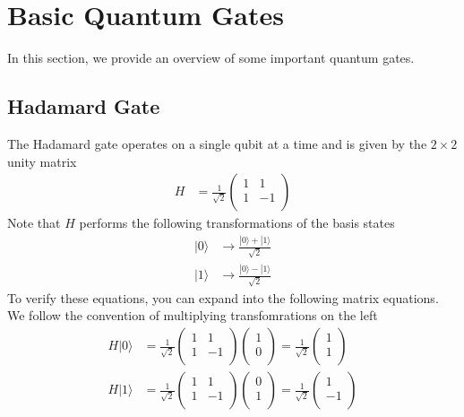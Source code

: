 \documentclass[book.tex]{subfiles}
\begin{document}
\section{Basic Quantum Gates}

In this section, we provide an overview of some important quantum gates. 

\subsection{Hadamard Gate}
The Hadamard gate operates on a single qubit at a time and is given by the $2\times 2$ unity matrix
\begin{align}
    H &= \frac{1}{\sqrt{2}}\begin{pmatrix}
    1 & 1 \\
    1 & -1 \\
    \end{pmatrix}
\end{align}
Note that $H$ performs the following transformations of the basis states
\begin{align}
    |0 \rangle & \to \frac{|0\rangle + |1 \rangle}{\sqrt{2}} \\
    |1 \rangle & \to \frac{|0 \rangle - |1 \rangle}{\sqrt{2}}
\end{align}
To verify these equations, you can expand into the following matrix equations. We follow the convention of multiplying transfomrations on the left
\begin{align}
    H | 0 \rangle &= \frac{1}{\sqrt{2}} \begin{pmatrix}
    1 & 1 \\
    1 & -1 \\
    \end{pmatrix}
    \begin{pmatrix}
    1 \\
    0 \\
    \end{pmatrix}
    = \frac{1}{\sqrt{2}}\begin{pmatrix}
    1 \\
    1 \\
    \end{pmatrix} \\
     H | 1 \rangle &= \frac{1}{\sqrt{2}} \begin{pmatrix}
    1 & 1 \\
    1 & -1 \\
    \end{pmatrix}
    \begin{pmatrix}
    0 \\
    1 \\
    \end{pmatrix}
    = \frac{1}{\sqrt{2}}\begin{pmatrix}
    1 \\
    -1 \\
    \end{pmatrix}
\end{align}
\end{document}
